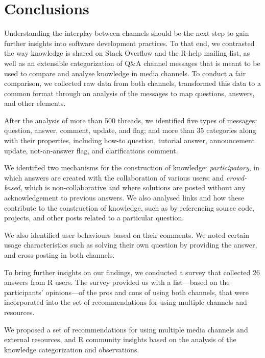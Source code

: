 \documentclass{sig-alternate-05-2015}
\begin{document}
\section{Conclusions}
\label{cha:conclusion}

	Understanding the interplay between channels should be the next step to gain further insights into software development practices.
	To that end, we contrasted the way knowledge is shared on Stack Overflow and the R-help mailing list, as well as an extensible categorization of Q\&A channel messages that is meant to be used to compare and analyse knowledge in media channels.
	To conduct a fair comparison, we collected raw data from both channels, transformed this data to a common format through an analysis of the messages to map questions, answers, and other elements.

	After the analysis of more than 500 threads, we identified five types of messages: question, answer, comment, update, and flag; and more than 35 categories along with their properties, including how-to question, tutorial answer, announcement update, not-an-answer flag, and clarifications comment.

	We identified two mechanisms for the construction of knowledge: \emph{participatory}, in which answers are created with the collaboration of various users; and \emph{crowd-based}, which is non-collaborative and where solutions are posted without any acknowledgement to previous answers.
	We also analysed links and how these contribute to the construction of knowledge, such as by referencing source code, projects, and other posts related to a particular question.

	We also identified user behaviours based on their comments.
	We noted certain usage characteristics such as solving their own question by providing the answer, and cross-posting in both channels.

	To bring further insights on our findings, we conducted a survey that collected 26 answers from R users.
	The survey provided us with a list---based on the participants' opinions---of the pros and cons of using both channels, that were incorporated into the set of recommendations for using multiple channels and resources.

	We proposed a set of recommendations for using multiple media channels and external resources, and R community insights based on the analysis of the knowledge categorization and observations.




\end{document}
